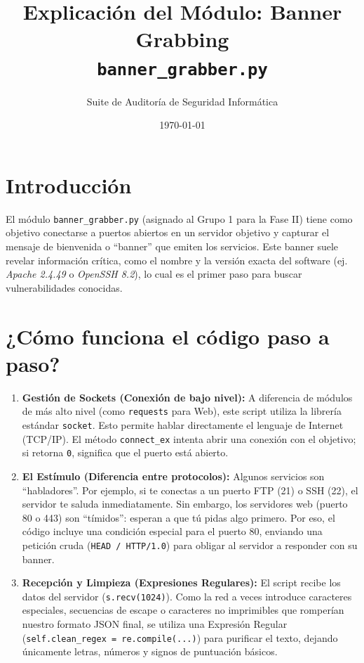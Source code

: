 \documentclass[12pt,a4paper]{article}
\title{\textbf{Explicación del Módulo: Banner Grabbing}\\ \large \texttt{banner\_grabber.py}}
\author{Suite de Auditoría de Seguridad Informática}
\date{\today}
\begin{document}
\maketitle

\section*{Introducción}
El módulo \texttt{banner\_grabber.py} (asignado al Grupo 1 para la Fase II) tiene como objetivo conectarse a puertos abiertos en un servidor objetivo y capturar el mensaje de bienvenida o ``banner'' que emiten los servicios. Este banner suele revelar información crítica, como el nombre y la versión exacta del software (ej. \textit{Apache 2.4.49} o \textit{OpenSSH 8.2}), lo cual es el primer paso para buscar vulnerabilidades conocidas.

\section*{¿Cómo funciona el código paso a paso?}

\begin{enumerate}
    \item \textbf{Gestión de Sockets (Conexión de bajo nivel):}
    A diferencia de módulos de más alto nivel (como \texttt{requests} para Web), este script utiliza la librería estándar \texttt{socket}. Esto permite hablar directamente el lenguaje de Internet (TCP/IP). El método \texttt{connect\_ex} intenta abrir una conexión con el objetivo; si retorna \texttt{0}, significa que el puerto está abierto.

    \item \textbf{El Estímulo (Diferencia entre protocolos):}
    Algunos servicios son ``habladores''. Por ejemplo, si te conectas a un puerto FTP (21) o SSH (22), el servidor te saluda inmediatamente. Sin embargo, los servidores web (puerto 80 o 443) son ``tímidos'': esperan a que tú pidas algo primero. Por eso, el código incluye una condición especial para el puerto 80, enviando una petición cruda (\texttt{HEAD / HTTP/1.0}) para obligar al servidor a responder con su banner.

    \item \textbf{Recepción y Limpieza (Expresiones Regulares):}
    El script recibe los datos del servidor (\texttt{s.recv(1024)}). Como la red a veces introduce caracteres especiales, secuencias de escape o caracteres no imprimibles que romperían nuestro formato JSON final, se utiliza una Expresión Regular (\texttt{self.clean\_regex = re.compile(...)}) para purificar el texto, dejando únicamente letras, números y signos de puntuación básicos.

\end{enumerate}
\end{document}
